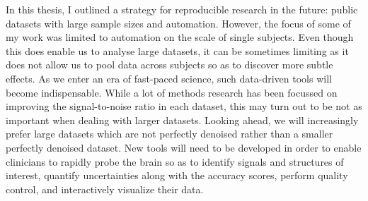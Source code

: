 In this thesis, I outlined a strategy for reproducible research in the future: public datasets with large sample sizes and automation. However, the focus of some of my work was limited to automation on the scale of single subjects. Even though this does enable us to analyse large datasets, it can be sometimes limiting as it does not allow us to pool data across subjects so as to discover more subtle effects. As we enter an era of fast-paced science, such data-driven tools will become indispensable. While a lot of methods research has been focussed on improving the signal-to-noise ratio in each dataset, this may turn out to be not as important when dealing with larger datasets. Looking ahead, we will increasingly prefer large datasets which are not perfectly denoised rather than a smaller perfectly denoised dataset. New tools will need to be developed in order to enable clinicians to rapidly probe the brain so as to identify signals and structures of interest, quantify uncertainties along with the accuracy scores, perform quality control, and interactively visualize their data.
